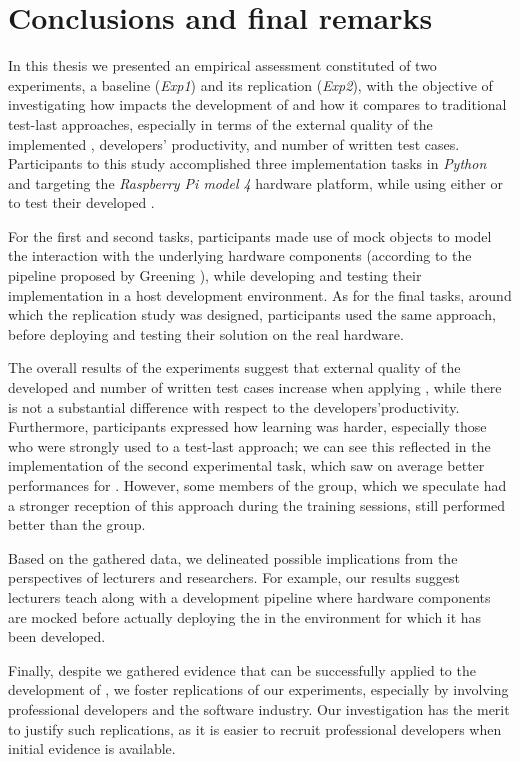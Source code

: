 \chapter{Conclusions and final remarks}
\label{chap:7_conclusions}
In this thesis we presented an empirical assessment constituted of two experiments, a baseline (\textit{Exp1}) and its replication (\textit{Exp2}), with the objective of investigating how \tdd impacts the development of \ess and how it compares to traditional test-last approaches, especially in terms of the external quality of the implemented \es, developers' productivity, and number of written test cases. 
Participants to this study accomplished three implementation tasks in \textit{Python} and targeting the \textit{Raspberry Pi model 4} hardware platform, while using either \tdd or \notdd to test their developed \ess.

For the first and second tasks, participants made use of mock objects to model the interaction with the underlying hardware components (according to the pipeline proposed by Greening \cite{TDDEC}), while developing and testing their implementation in a host development environment. As for the final tasks, around which the replication study was designed, participants used the same approach, before deploying and testing their solution on the real hardware.

The overall results of the experiments suggest that external quality of the developed \ess and number of written test cases increase when applying \tdd, while there is not a substantial difference with respect to the developers'productivity. Furthermore, participants expressed how learning \tdd was harder, especially those who were strongly used to a test-last approach; we can see this reflected in the implementation of the second experimental task, which saw on average better performances for \notdd. However, some members of the \tdd group, which we speculate had a stronger reception of this approach during the training sessions, still performed better than the \notdd group.

Based on the gathered data, we delineated possible implications from the perspectives of lecturers and researchers. For example, our results suggest lecturers teach \tdd along with a development pipeline where hardware components are mocked before actually deploying the \es in the environment for which it has been developed. 

Finally, despite we gathered evidence that \tdd can be successfully applied to the development of \ess, we foster replications of our experiments, especially by involving professional developers and the software industry. 
Our investigation has the merit to justify such replications, as it is easier to recruit professional developers when initial evidence is available. 

